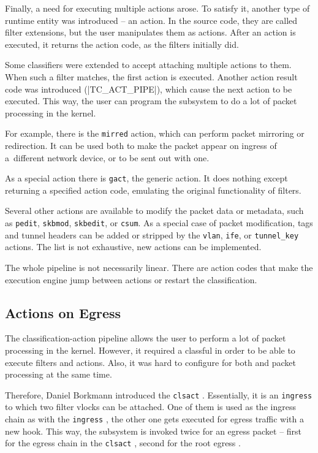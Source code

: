 Finally, a need for executing multiple actions arose. To satisfy it,
another type of runtime entity was introduced -- an action. In the source code,
they are called filter extensions, but the user manipulates them as
actions. After an action is executed, it returns the action code, as the
filters initially did.

Some classifiers were extended to accept attaching multiple actions to them. When such a
filter matches, the first action is executed. Another action result code was
introduced (\macro|TC_ACT_PIPE|), which cause the next action to be executed. This
way, the user can program the subsystem to do a lot of packet processing in the
kernel.

For example, there is the \texttt{mirred} action, which can perform packet
mirroring or redirection. It can be used both to make the packet appear on
ingress of a~different network device, or to be sent out with one.

As a special action there is \texttt{gact}, the generic action. It does
nothing except returning a specified action code, emulating the original
functionality of filters.

Several other actions are available to modify the packet data or metadata,
such as \texttt{pedit}, \texttt{skbmod}, \texttt{skbedit}, or \texttt{csum}. As
a special case of packet modification,  tags and tunnel headers can
be added or stripped by the \texttt{vlan}, \texttt{ife}, or \texttt{tunnel\_key}
actions. The list is not exhaustive, new actions can be implemented.

The whole pipeline is not necessarily linear. There are action codes that
make the execution engine jump between actions or restart the classification.

\subsection{Actions on Egress}

The classification-action pipeline allows the user to perform a lot of packet
processing in the kernel. However, it required a classful \qdisc{} in order to
be able to execute filters and actions. Also, it was hard to configure 
for both  and packet processing at the same time.

Therefore, Daniel Borkmann introduced the \texttt{clsact} \qdisc
\cite{linux-tc-clsact}. Essentially, it is an \texttt{ingress} \qdisc{} to which
two filter vlocks can be attached. One of them is used as the ingress chain as
with the \texttt{ingress} \qdisc, the other one gets executed for egress traffic
with a new hook. This way, the  subsystem is invoked twice for an egress
packet -- first for the egress chain in the \texttt{clsact} \qdisc, second for the
root egress \qdisc.

